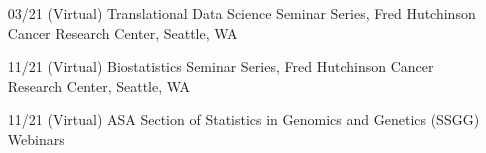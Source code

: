 \documentclass[10pt]{article}
\begin{document}
\begin{enumerate}
\item[03/21] (Virtual) Translational Data Science Seminar Series, Fred Hutchinson Cancer Research Center, Seattle, WA
\item[11/21]  (Virtual) Biostatistics Seminar Series, Fred Hutchinson Cancer Research Center, Seattle, WA
\item[11/21]  (Virtual) ASA Section of Statistics in Genomics and Genetics (SSGG) Webinars
\end{enumerate}
\end{document}
